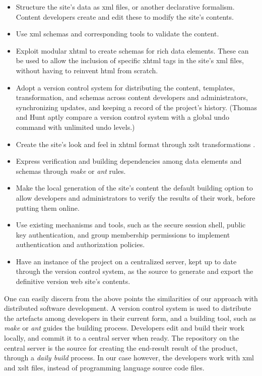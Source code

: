 \documentclass[10pt]{article}
\begin{document}
\begin{itemize}
\item Structure the site's data as {\sc xml} files,
or another declarative formalism.
Content developers create and edit these to modify the site's contents.
\item Use {\sc xml} schemas and corresponding tools to validate the content.
\item Exploit modular {\sc xhtml} \cite{W3C_MODULAR_XHTML} to create schemas for rich
data elements.
These can be used to allow the inclusion of specific {\sc xhtml} tags
in the site's {\sc xml} files, without having to reinvent {\sc html}
from scratch.
\item Adopt a version control system for distributing the content,
templates, transformation, and schemas across content developers and
administrators, synchronizing updates, and keeping a record of the project's history.
(Thomas and Hunt \cite{HT00} aptly compare a version control system
with a global undo command with unlimited undo levels.)
\item Create the site's look and feel in {\sc xhtml} format
through {\sc xslt}  transformations \cite{HM01}.
\item Express verification and building dependencies among
data elements and schemas through {\em make} \cite{MAKE} or {\em ant}
\cite{JAKARTA_ANT} rules.
\item Make the local generation of the site's content the default
building option to allow developers and administrators to verify
the results of  their work, before putting them online.
\item Use existing mechanisms and tools, such as the secure session shell,
public key authentication, and group membership permissions to implement
authentication and authorization policies.
\item Have an instance of the project on a centralized server, kept up to
date through the version control system, as the source to generate and export
the definitive version web site's contents.
\end{itemize}

One can easily discern from the above points the similarities of our
approach with distributed software development.
A version control system is used to distribute the artefacts among
developers in their current form, and a building tool, such as {\em make}
or {\em ant} guides the building process.
Developers edit and build their work locally, and commit it to a central server when ready.
The repository on the central server is the source for creating the end-result
result of the product, through a {\em daily build} process.
In our case however, the developers work with {\sc xml} and {\sc xslt}
files, instead of programming language source code files.
\end{document}
